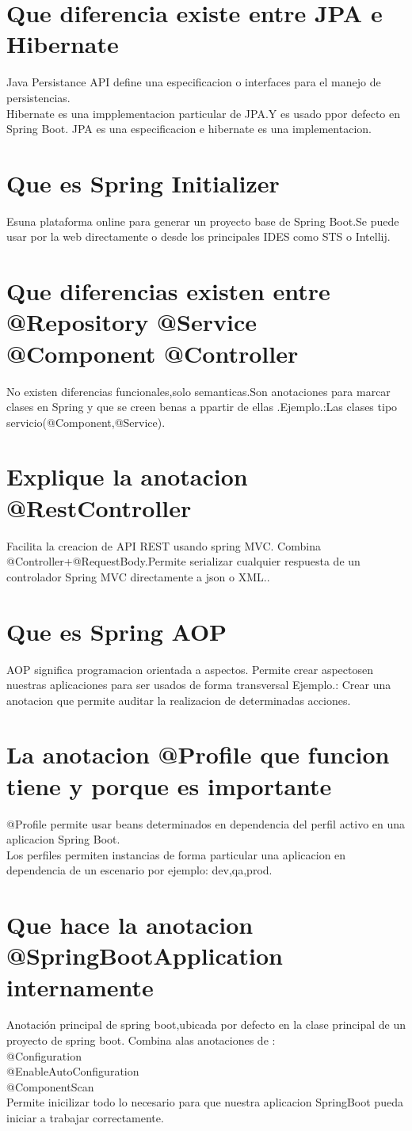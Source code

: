 \section{Que diferencia existe entre JPA e Hibernate}
Java Persistance API define una especificacion o interfaces para el manejo de persistencias.\\
Hibernate es una impplementacion particular de JPA.Y es usado ppor defecto en Spring Boot.
JPA es una especificacion e hibernate es una implementacion.
\section{Que es Spring Initializer}
Esuna plataforma online para generar un proyecto base de Spring Boot.Se puede usar por la web
directamente o desde los principales IDES como STS o Intellij.
\section{Que diferencias existen entre @Repository @Service
	@Component @Controller}
No existen diferencias funcionales,solo semanticas.Son anotaciones para marcar clases en Spring y que se creen benas a ppartir de ellas .Ejemplo.:Las clases tipo servicio(@Component,@Service).
\section{Explique la anotacion @RestController}
Facilita la creacion de API REST usando spring MVC.
Combina @Controller+@RequestBody.Permite serializar cualquier respuesta de un controlador
Spring MVC directamente a json o XML..
\section{Que es Spring AOP}
AOP significa programacion orientada a aspectos.
Permite crear aspectosen nuestras aplicaciones para ser usados de forma transversal
Ejemplo.: Crear una anotacion que permite auditar la realizacion  de determinadas acciones.
\section{La anotacion @Profile que funcion tiene y porque es importante}
@Profile permite usar beans determinados en dependencia del perfil activo en una aplicacion Spring Boot.\\
Los perfiles permiten instancias de forma particular una aplicacion en dependencia de un escenario por ejemplo: dev,qa,prod.
\section{Que hace la anotacion @SpringBootApplication internamente}
Anotaci\'on principal de spring boot,ubicada por defecto en la clase principal de un proyecto de spring boot.
Combina alas anotaciones de :\\
 @Configuration\\
 @EnableAutoConfiguration\\
 @ComponentScan\\
Permite inicilizar todo lo necesario para que nuestra aplicacion SpringBoot pueda iniciar a trabajar correctamente.
